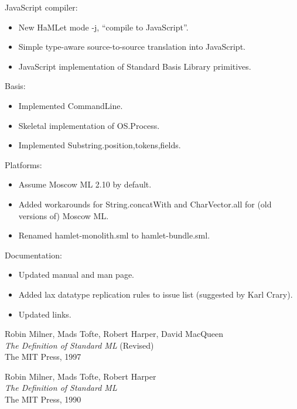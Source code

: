 \documentclass[twoside,titlepage]{article}
\begin{document}
\begin{appendix}
JavaScript compiler:
\begin{itemize}[nolistsep]
\item New HaMLet mode -j, ``compile to JavaScript''.
\item Simple type-aware source-to-source translation into JavaScript.
\item JavaScript implementation of Standard Basis Library primitives.
\end{itemize}

Basis:
\begin{itemize}[nolistsep]
\item Implemented CommandLine.
\item Skeletal implementation of OS.Process.
\item Implemented Substring.{position,tokens,fields}.
\end{itemize}

Platforms:
\begin{itemize}[nolistsep]
\item Assume Moscow ML 2.10 by default.
\item Added workarounds for String.concatWith and CharVector.all for (old versions of) Moscow ML.
\item Renamed hamlet-monolith.sml to hamlet-bundle.sml.
\end{itemize}

Documentation:
\begin{itemize}[nolistsep]
\item Updated manual and man page.
\item Added lax datatype replication rules to issue list (suggested by Karl Crary).
\item Updated links.
\end{itemize}


\vfill
\pagebreak
\begin{thebibliography}{MTHM97}

Robin Milner, Mads Tofte, Robert Harper, David MacQueen \\
{\it The Definition of Standard ML} (Revised) \\
The MIT Press, 1997

Robin Milner, Mads Tofte, Robert Harper \\
{\it The Definition of Standard ML} \\
The MIT Press, 1990


\end{thebibliography}
\end{appendix}
\end{document}
